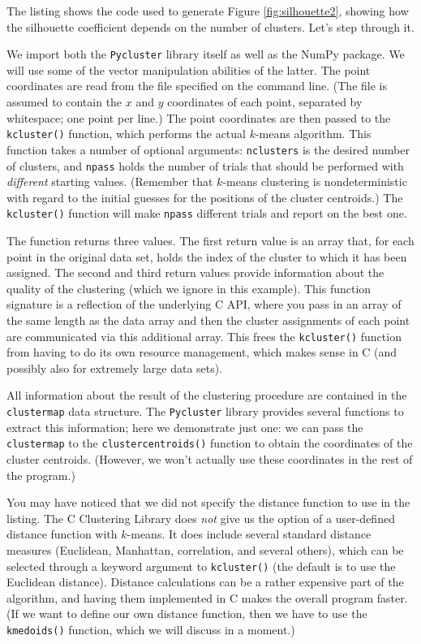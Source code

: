 The listing shows the code used to generate Figure
\ref{fig:silhouette2}, showing how the silhouette coefficient depends
on the number of clusters. Let's step through it.

We import both the \texttt{Pycluster} library itself as well as the
NumPy package. We will use some of the vector manipulation abilities
of the latter. The point coordinates are read from the file specified
on the command line.  (The file is assumed to contain the $x$ and $y$
coordinates of each point, separated by whitespace; one point per
line.)  The point coordinates are then passed to the
\texttt{kcluster()} function, which performs the actual $k$-means
algorithm. This function takes a number of optional arguments:
\texttt{nclusters} is the desired number of clusters, and
\texttt{npass} holds the number of trials that should be performed
with \emph{different} starting values.  (Remember that $k$-means
clustering is nondeterministic with regard to the initial guesses for
the positions of the cluster centroids.) The \texttt{kcluster()}
function will make \texttt{npass} different trials and report on the
best one.

The function returns three values. The first return value is an array
that, for each point in the original data set, holds the index of the
cluster to which it has been assigned. The second and third return
values provide information about the quality of the clustering (which
we ignore in this example). This function signature is a reflection of
the underlying C API, where you pass in an array of the same length as
the data array and then the cluster assignments of each point are
communicated via this additional array.  This frees the
\texttt{kcluster()} function from having to do its own resource
management, which makes sense in C (and possibly also for extremely
large data sets).

All information about the result of the clustering procedure are
contained in the \texttt{clustermap} data structure. The
\texttt{Pycluster} library  provides several functions to extract this
information; here we demonstrate just one: we can pass the
\texttt{clustermap} to the \texttt{clustercentroids()} function to
obtain the coordinates of the cluster centroids. (However, we won't
actually use these coordinates in the rest of the program.)

You may have noticed that we did not specify the distance function to
use in the listing. The C Clustering Library does \emph{not} give us
the option of a user-defined distance function with $k$-means. It does
include several standard distance measures (Euclidean, Manhattan,
correlation, and several others), which can be selected through a
keyword argument to \texttt{kcluster()} (the default is to use the
Euclidean distance).  Distance calculations can be a rather expensive
part of the algorithm,\vadjust{\pagebreak} and having them implemented in C makes the
overall program faster.  (If we want to define our own distance
function, then we have to use the \texttt{kmedoids()} function, which
we will discuss in a moment.)

